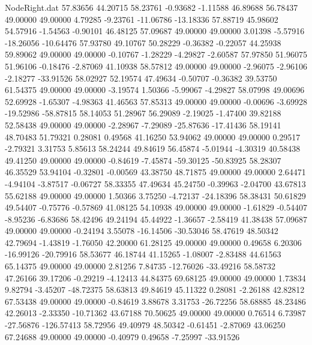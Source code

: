 \begin{filecontents}{NodeRight.dat}
  57.83656   44.20715   58.23761    -0.93682   -1.11588   46.89688   56.78437   49.00000   49.00000    4.79285   -9.23761  -11.06786  -13.18336
  57.88719   45.98602   54.57916    -1.54563   -0.90101   46.48125   57.09687   49.00000   49.00000    3.01398   -5.57916  -18.26056  -10.64476
  57.93780   49.10767   50.28229    -0.36382   -0.22057   44.25938   59.89062   49.00000   49.00000   -0.10767   -1.28229   -4.29827   -2.60587
  57.97850   51.96075   51.96106    -0.18476   -2.87069   41.10938   58.57812   49.00000   49.00000   -2.96075   -2.96106   -2.18277  -33.91526
  58.02927   52.19574   47.49634    -0.50707   -0.36382   39.53750   61.54375   49.00000   49.00000   -3.19574    1.50366   -5.99067   -4.29827
  58.07998   49.00696   52.69928    -1.65307   -4.98363   41.46563   57.85313   49.00000   49.00000   -0.00696   -3.69928  -19.52986  -58.87815
  58.14053   51.28967   56.29089    -2.19025   -1.47400   39.82188   52.58438   49.00000   49.00000   -2.28967   -7.29089  -25.87636  -17.41436
  58.19141   48.70483   51.79321     0.28081    0.49568   41.16250   53.94062   49.00000   49.00000    0.29517   -2.79321    3.31753    5.85613
  58.24244   49.84619   56.45874    -5.01944   -4.30319   40.58438   49.41250   49.00000   49.00000   -0.84619   -7.45874  -59.30125  -50.83925
  58.28307   46.35529   53.94104    -0.32801   -0.00569   43.38750   48.71875   49.00000   49.00000    2.64471   -4.94104   -3.87517   -0.06727
  58.33355   47.49634   45.24750    -0.39963   -2.04700   43.67813   55.62188   49.00000   49.00000    1.50366    3.75250   -4.72137  -24.18396
  58.38431   50.61829   49.54407    -0.75776   -0.57869   41.08125   54.10938   49.00000   49.00000   -1.61829   -0.54407   -8.95236   -6.83686
  58.42496   49.24194   45.44922    -1.36657   -2.58419   41.38438   57.09687   49.00000   49.00000   -0.24194    3.55078  -16.14506  -30.53046
  58.47619   48.50342   42.79694    -1.43819   -1.76050   42.20000   61.28125   49.00000   49.00000    0.49658    6.20306  -16.99126  -20.79916
  58.53677   46.18744   41.15265    -1.08007   -2.83488   44.61563   65.14375   49.00000   49.00000    2.81256    7.84735  -12.76026  -33.49216
  58.58732   47.26166   39.17206    -0.29219   -4.12413   44.84375   69.68125   49.00000   49.00000    1.73834    9.82794   -3.45207  -48.72375
  58.63813   49.84619   45.11322     0.28081   -2.26188   42.82812   67.53438   49.00000   49.00000   -0.84619    3.88678    3.31753  -26.72256
  58.68885   48.23486   42.26013    -2.33350  -10.71362   43.67188   70.50625   49.00000   49.00000    0.76514    6.73987  -27.56876 -126.57413
  58.72956   49.40979   48.50342    -0.61451   -2.87069   43.06250   67.24688   49.00000   49.00000   -0.40979    0.49658   -7.25997  -33.91526

\end{filecontents}
